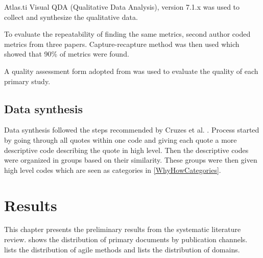 \documentclass{sig-alternate}
\begin{document}
Atlas.ti Visual QDA (Qualitative Data Analysis), version 7.1.x was used to
collect and synthesize the qualitative data.

To evaluate the repeatability of finding the same metrics, second author
coded metrics from three papers. Capture-recapture method
\cite{seber2002estimation} was then used which showed that 90\% of metrics
were found.

A quality assessment form adopted from \cite{dyba_empirical_2008} was used to
evaluate the quality of each primary study. 

%

\subsection{Data synthesis}
Data synthesis followed the steps recommended by Cruzes et al. \cite{6092576}.
Process started by going through all quotes within one code and giving each quote a
more descriptive code describing the quote in high level. Then the descriptive
codes were organized in groups based on their similarity. These groups were
then given high level codes which are seen as categories in
\cref{WhyHowCategories}.

\section{Results} %
\label{sec:Results}

This chapter presents the preliminary results from the systematic literature 
review.  shows the distribution of primary
documents by publication channels.  lists the
distribution of agile methods and  lists the distribution of
domains. %
\end{document}
